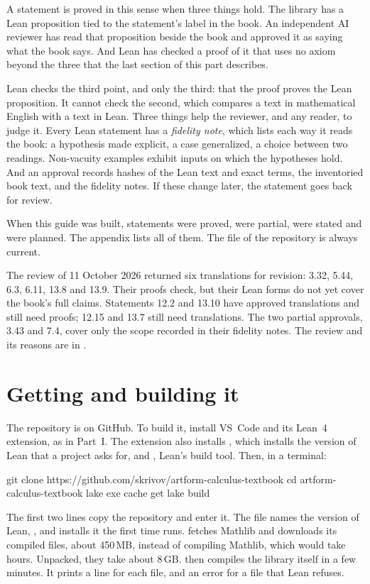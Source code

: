 A statement is proved in this sense when three things hold. The library has
a Lean proposition tied to the statement's label in the book. An independent
AI reviewer has
read that proposition beside the book and approved it as saying what the
book says. And Lean has checked a proof of it that uses no axiom beyond
the three that the last section of this part describes.

Lean checks the third point, and only the third: that the proof proves the
Lean proposition. It cannot check the second, which compares a text in
mathematical English with a text in Lean. Three things help the reviewer, and
any reader, to judge it. Every Lean statement has a \emph{fidelity note},
which lists each way it reads the book: a hypothesis made explicit, a case
generalized, a choice between two readings. Non-vacuity examples exhibit
inputs on which the hypotheses hold. And an approval records hashes of the
Lean text and exact terms, the inventoried book text, and the fidelity notes.
If these change later, the statement goes back for review.

When this guide was built,  statements were proved,
 were partial,  were stated and
 were planned.
The appendix lists all of them. The file  of the
repository is always current.

The review of 11 October 2026 returned six translations for revision:
3.32, 5.44, 6.3, 6.11, 13.8 and 13.9. Their proofs check, but their Lean
forms do not yet cover the book's full claims. Statements 12.2 and 13.10
have approved translations and still need proofs; 12.15 and 13.7 still need
translations. The two partial approvals, 3.43 and 7.4, cover only the scope
recorded in their fidelity notes. The review and its reasons are in
.

\section*{Getting and building it}

The repository is on GitHub. To build it, install VS~Code and its Lean~4
extension, as in Part~I. The extension also installs , which
installs the version of Lean that a project asks for, and ,
Lean's build tool. Then, in a terminal:
\begin{shellcommands}
git clone https://github.com/skrivov/artform-calculus-textbook
cd artform-calculus-textbook
lake exe cache get
lake build
\end{shellcommands}
The first two lines copy the repository and enter it. The file
 names the version of Lean, \leanversion, and 
installs it the first time  runs.  fetches
Mathlib and downloads its compiled files, about 450\,MB, instead of
compiling Mathlib, which would take hours. Unpacked, they take about 8\,GB.
 then compiles the library itself in a few minutes. It
prints a line for each file, and an error for a file that Lean refuses.

